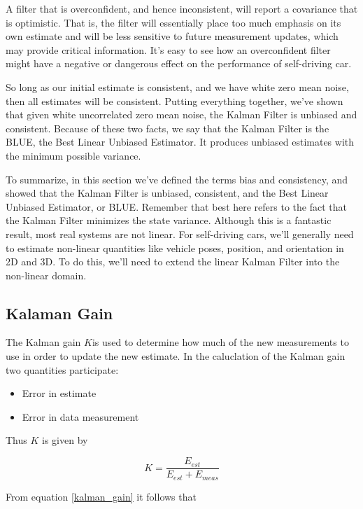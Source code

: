A filter that is overconfident,
and hence inconsistent, will report a covariance
that is optimistic. That is, the filter will essentially place
too much emphasis on its own estimate and will be less sensitive to
future measurement updates, which may provide critical information. It's easy to see how an overconfident
filter might have a negative or dangerous effect on the performance
of self-driving car. 


So long as our initial
estimate is consistent, and we have white zero mean noise,
then all estimates will be consistent. Putting everything together,
we've shown that given white uncorrelated zero mean noise, the Kalman
Filter is unbiased and consistent. Because of these two facts, we say that the Kalman Filter is the BLUE,
the Best Linear Unbiased Estimator. It produces unbiased estimates with
the minimum possible variance. 

To summarize, in this section we've defined the terms bias and consistency, and
showed that the Kalman Filter is unbiased, consistent, and the Best Linear
Unbiased Estimator, or BLUE. Remember that best here refers to
the fact that the Kalman Filter minimizes the state variance. Although this is a fantastic result,
most real systems are not linear. For self-driving cars, we'll
generally need to estimate non-linear quantities like vehicle poses,
position, and orientation in 2D and 3D. To do this, we'll need to extend the linear
Kalman Filter into the non-linear domain. 


\subsection{Kalaman Gain}
The Kalman gain $K$is used to determine how much of the new measurements to use in order to update the new estimate.
In the caluclation of the Kalman gain two quantities participate:

\begin{itemize}
\item Error in estimate
\item Error in data measurement
\end{itemize}

Thus $K$ is given by

\begin{equation}
K = \frac{E_{est}}{E_{est} + E_{meas}}
\label{kalman_gain}
\end{equation} 

From equation \ref{kalman_gain} it follows that


